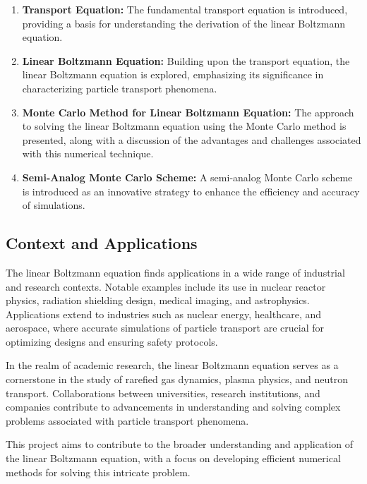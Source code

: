 \documentclass[a4paper, 11pt]{article}
\begin{document}
	\begin{enumerate}
		\item \textbf{Transport Equation:} The fundamental transport equation is introduced, providing a basis for understanding the derivation of the linear Boltzmann equation.
		
		\item \textbf{Linear Boltzmann Equation:} Building upon the transport equation, the linear Boltzmann equation is explored, emphasizing its significance in characterizing particle transport phenomena.
		
		\item \textbf{Monte Carlo Method for Linear Boltzmann Equation:} The approach to solving the linear Boltzmann equation using the Monte Carlo method is presented, along with a discussion of the advantages and challenges associated with this numerical technique.
		
		\item \textbf{Semi-Analog Monte Carlo Scheme:} A semi-analog Monte Carlo scheme is introduced as an innovative strategy to enhance the efficiency and accuracy of simulations.
	\end{enumerate}
	
\subsection{Context and Applications}
	
	The linear Boltzmann equation finds applications in a wide range of industrial and research contexts. Notable examples include its use in nuclear reactor physics, radiation shielding design, medical imaging, and astrophysics. Applications extend to industries such as nuclear energy, healthcare, and aerospace, where accurate simulations of particle transport are crucial for optimizing designs and ensuring safety protocols.
	
	In the realm of academic research, the linear Boltzmann equation serves as a cornerstone in the study of rarefied gas dynamics, plasma physics, and neutron transport. Collaborations between universities, research institutions, and companies contribute to advancements in understanding and solving complex problems associated with particle transport phenomena.
	
	
	\medbreak
	
	This project aims to contribute to the broader understanding and application of the linear Boltzmann equation, with a focus on developing efficient numerical methods for solving this intricate problem.
\end{document}
